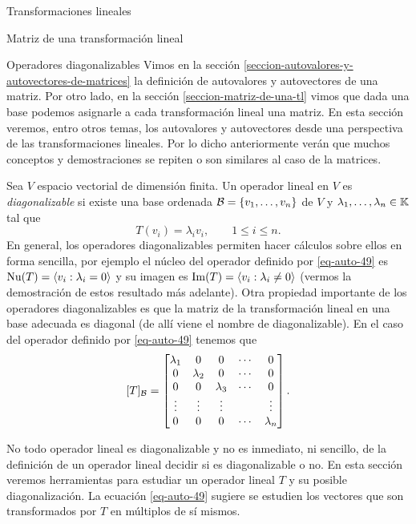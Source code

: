 \begin{chapter}{Transformaciones lineales}
\begin{section}{Matriz de una transformaci\'on lineal}
        \end{section}    
    
        \begin{section}{Operadores diagonalizables}\label{seccion-autovalores-y-autovectores-de-una-tl}
        Vimos en la sección  \ref{seccion-autovalores-y-autovectores-de-matrices} la definición de autovalores y autovectores de una matriz. Por otro lado,  en la sección \ref{seccion-matriz-de-una-tl} vimos que dada una base podemos asignarle a cada transformación lineal una matriz. En  esta sección veremos,  entro otros temas,  los autovalores y autovectores desde una perspectiva de las transformaciones lineales. Por lo dicho anteriormente  verán que muchos conceptos y demostraciones se repiten o son similares al caso de la matrices. 
        
        Sea $V$ espacio vectorial de dimensión finita. Un operador lineal en $V$ es \textit{diagonalizable}  si existe una base ordenada $\mathcal{B}= \{v_1,\ldots,v_n\}$ de $V$ y $\lambda_1,\ldots,\lambda_n \in \mathbb K$ tal que 
        \begin{equation}\label{eq-auto-49}
            T(v_i) = \lambda_i v_i,\qquad 1\le i \le n. 
        \end{equation}
        En  general, los operadores diagonalizables permiten hacer cálculos sobre ellos en forma sencilla, por ejemplo el núcleo del  operador definido por \eqref{eq-auto-49} es $\operatorname{Nu}(T)=\langle v_i: \lambda_i =0 \rangle$ y  su imagen es $\operatorname{Im}(T)=\langle v_i: \lambda_i \not=0 \rangle$ (vermos la demostración de estos resultado más adelante). 
        Otra propiedad importante de los operadores diagonalizables es que la matriz de la transformación lineal en una base adecuada es diagonal (de allí viene el nombre de diagonalizable). En  el caso del  operador definido por \eqref{eq-auto-49} tenemos que
        $$
        [T]_{\mathcal{B}} = 
        \begin{bmatrix}
        \lambda_1&0&0&\cdots&0 \\
        0&\lambda_2&0&\cdots&0\\
        0&0&\lambda_3&\cdots&0\\
        \vdots&\vdots&\vdots&&\vdots\\
        0&0&0&\cdots&\lambda_n
        \end{bmatrix}.
        $$
        
        
        No todo operador lineal es diagonalizable y no es inmediato, ni sencillo, de la definición de un operador lineal decidir si es diagonalizable o no. En esta sección veremos herramientas para estudiar un operador lineal $T$ y su posible diagonalización. La ecuación \eqref{eq-auto-49} sugiere se estudien los vectores que son transformados por $T$ en múltiplos de sí mismos.
        

\end{section}
\end{chapter}
